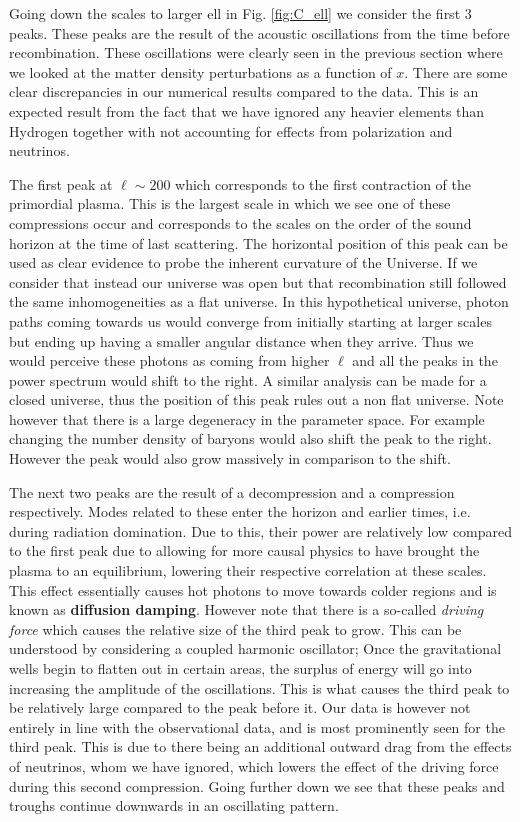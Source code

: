 \documentclass[%
reprint,
 amsmath,amssymb,
 aps,
]{revtex4-2}
\begin{document}
Going down the scales to larger ell in Fig. \ref{fig:C_ell} we consider the first 3 peaks. These peaks are the result of the acoustic oscillations from the time before recombination. These oscillations were clearly seen in the previous section where we looked at the matter density perturbations as a function of $x$. There are some clear discrepancies in our numerical results compared to the data. This is an expected result from the fact that we have ignored any heavier elements than Hydrogen together with not accounting for effects from polarization and neutrinos. 

The first peak at $\ell\sim200$ which corresponds to the first contraction of the primordial plasma. This is the largest scale in which we see one of these compressions occur and corresponds to the scales on the order of the sound horizon at the time of last scattering. The horizontal position of this peak can be used as clear evidence to probe the inherent curvature of the Universe. If we consider that instead our universe was open but that recombination still followed the same inhomogeneities as a flat universe. In this hypothetical universe, photon paths coming towards us would converge from initially starting at larger scales but ending up having a smaller angular distance when they arrive. Thus we would perceive these photons as coming from higher $\ell$ and all the peaks in the power spectrum would shift to the right. A similar analysis can be made for a closed universe, thus the position of this peak rules out a non flat universe. Note however that there is a large degeneracy in the parameter space. For example changing the number density of baryons would also shift the peak to the right. However the peak would also grow massively in comparison to the shift.

The next two peaks are the result of a decompression and a compression respectively. Modes related to these enter the horizon and earlier times, i.e. during radiation domination. Due to this, their power are relatively low compared to the first peak due to allowing for more causal physics to have brought the plasma to an equilibrium, lowering their respective correlation at these scales. This effect essentially causes hot photons to move towards colder regions and is known as \textbf{diffusion damping}. However note that there is a so-called \textit{driving force} which causes the relative size of the third peak to grow. This can be understood by considering a coupled harmonic oscillator; Once the gravitational wells begin to flatten out in certain areas, the surplus of energy will go into increasing the amplitude of the oscillations. This is what causes the third peak to be relatively large compared to the peak before it. Our data is however not entirely in line with the observational data, and is most prominently seen for the third peak. This is due to there being an additional outward drag from the effects of neutrinos, whom we have ignored, which lowers the effect of the driving force during this second compression. Going further down we see that these peaks and troughs continue downwards in an oscillating pattern. 
\end{document}
